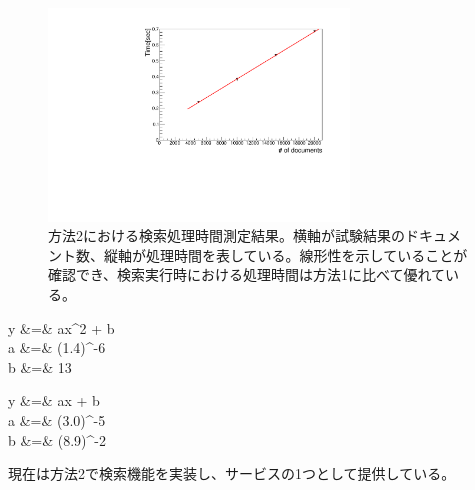 \begin{figure}[bpt]
  \begin{center}
  \includegraphics[width=8cm,angle=270]{result_mongo_collection_search.pdf}
  \caption[方法2における検索処理時間測定結果]{方法2における検索処理時間測定結果。横軸が試験結果のドキュメント数、縦軸が処理時間を表している。線形性を示していることが確認でき、検索実行時における処理時間は方法1に比べて優れている。}
  \label{searching_time}
  \end{center}
\end{figure}

\bbb
y &=&  ax^2 + b \\
\label{function_python_list}
a &=& (1.4)^{-6} \nonumber \\
b &=& 13 \nonumber
\eee

\bbb
y &=& ax + b \\
\label{function_mongo_collection}
a &=& (3.0)^{-5} \nonumber \\
b &=& (8.9)^{-2} \nonumber
\eee

現在は方法2で検索機能を実装し、サービスの1つとして提供している。


